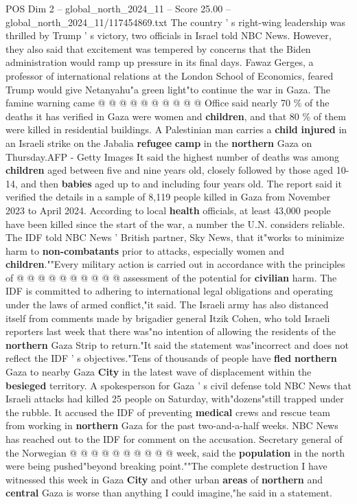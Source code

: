 \begin{textsample}{POS Dim 2 – global\_north\_2024\_11 – Score 25.00 – global\_north\_2024\_11/117454869.txt}
The country ' s right-wing leadership was thrilled by Trump ' s victory, two officials in Israel told NBC News.
However, they also said that excitement was tempered by concerns that the Biden administration would ramp up pressure in its final days.
Fawaz Gerges, a professor of international relations at the London School of Economics, feared Trump would give Netanyahu"a green light"to continue the war in Gaza.
The famine warning came @ @ @ @ @ @ @ @ @ @ Office said nearly 70 \% of the deaths it has verified in Gaza were women and \textbf{children}, and that 80 \% of them were killed in residential buildings.
A Palestinian man carries a \textbf{child} \textbf{injured} in an Israeli strike on the Jabalia \textbf{refugee} \textbf{camp} in the \textbf{northern} Gaza on Thursday.AFP - Getty Images It said the highest number of deaths was among \textbf{children} aged between five and nine years old, closely followed by those aged 10-14, and then \textbf{babies} aged up to and including four years old.
The report said it verified the details in a sample of 8,119 people killed in Gaza from November 2023 to April 2024.
According to local \textbf{health} officials, at least 43,000 people have been killed since the start of the war, a number the U.N. considers reliable.
The IDF told NBC News ' British partner, Sky News, that it"works to minimize harm to \textbf{non-combatants} prior to attacks, especially women and \textbf{children}.""Every military action is carried out in accordance with the principles of @ @ @ @ @ @ @ @ @ @ assessment of the potential for \textbf{civilian} harm.
The IDF is committed to adhering to international legal obligations and operating under the laws of armed conflict,"it said.
The Israeli army has also distanced itself from comments made by brigadier general Itzik Cohen, who told Israeli reporters last week that there was"no intention of allowing the residents of the \textbf{northern} Gaza Strip to return."It said the statement was"incorrect and does not reflect the IDF ' s objectives."Tens of thousands of people have \textbf{fled} \textbf{northern} Gaza to nearby Gaza \textbf{City} in the latest wave of displacement within the \textbf{besieged} territory.
A spokesperson for Gaza ' s civil defense told NBC News that Israeli attacks had killed 25 people on Saturday, with"dozens"still trapped under the rubble.
It accused the IDF of preventing \textbf{medical} crews and rescue team from working in \textbf{northern} Gaza for the past two-and-a-half weeks.
NBC News has reached out to the IDF for comment on the accusation.
Secretary general of the Norwegian @ @ @ @ @ @ @ @ @ @ week, said the \textbf{population} in the north were being pushed"beyond breaking point.""The complete destruction I have witnessed this week in Gaza \textbf{City} and other urban \textbf{areas} of \textbf{northern} and \textbf{central} Gaza is worse than anything I could imagine,"he said in a statement.

\end{textsample}
